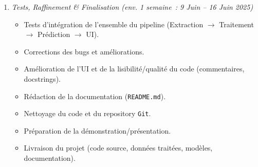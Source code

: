 \documentclass[11pt, a4paper]{article}
\newcommand{\lib}[1]{\texttt{#1}}
\newcommand{\endDate}{16 Juin 2025}
\begin{document}
\begin{enumerate}[label=Phase \arabic*:, wide, labelwidth=!, labelindent=0pt, leftmargin=*, itemsep=0.5em]
    \item \textit{Tests, Raffinement \& Finalisation (env. 1 semaine~: 9 Juin -- \endDate)}
    \begin{itemize}[label=\textendash, itemsep=0.2em, leftmargin=*]
        \item Tests d'intégration de l'ensemble du pipeline (Extraction $\rightarrow$ Traitement $\rightarrow$ Prédiction $\rightarrow$ UI).
        \item Corrections des bugs et améliorations. %
        \item Amélioration de l'UI et de la lisibilité/qualité du code (commentaires, docstrings). %
        \item Rédaction de la documentation (\texttt{README.md}). %
        \item Nettoyage du code et du repository \lib{Git}. %
        \item Préparation de la démonstration/présentation. %
        \item Livraison du projet (code source, données traitées, modèles, documentation). %
    \end{itemize}
\end{enumerate}
\end{document}
